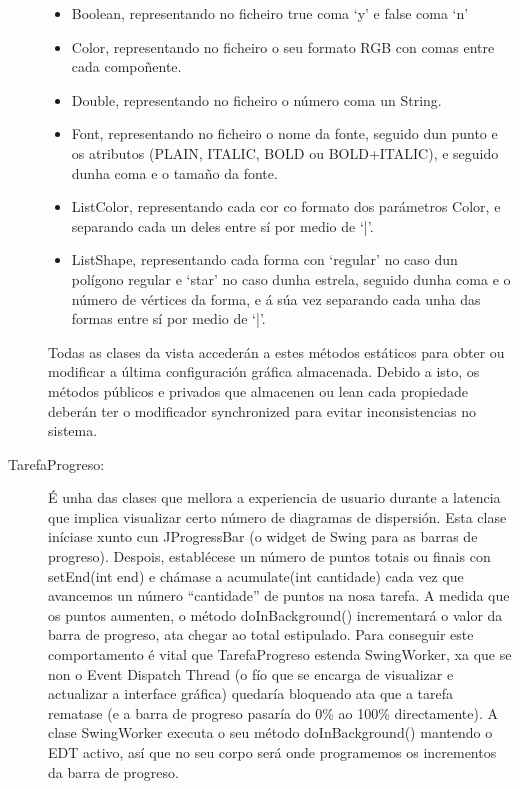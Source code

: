 \begin{description}
\begin{itemize}
\item Boolean, representando no ficheiro true coma `y' e false coma `n'
\item Color, representando no ficheiro o seu formato RGB con comas entre cada compoñente.
\item Double, representando no ficheiro o número coma un String.
\item Font, representando no ficheiro o nome da fonte, seguido dun punto e os atributos (PLAIN, ITALIC, BOLD ou BOLD+ITALIC), e seguido dunha coma e o tamaño da fonte.
\item ListColor, representando cada cor co formato dos parámetros Color, e separando cada un deles entre sí por medio de `|'.
\item ListShape, representando cada forma con `regular' no caso dun polígono regular e `star' no caso dunha estrela, seguido dunha coma e o número de vértices da forma, e á súa vez separando cada unha das formas entre sí por medio de `|'.
\end{itemize}

Todas as clases da vista accederán a estes métodos estáticos para obter ou modificar a última configuración gráfica almacenada. Debido a isto, os métodos públicos e privados que almacenen ou lean cada propiedade deberán ter o modificador synchronized para evitar inconsistencias no sistema.

\item[TarefaProgreso:] \hfill
É unha das clases que mellora a experiencia de usuario durante a latencia que implica visualizar certo número de diagramas de dispersión. Esta clase iníciase xunto cun JProgressBar (o widget de Swing para as barras de progreso). Despois, establécese un número de puntos totais ou finais con setEnd(int end) e chámase a acumulate(int cantidade) cada vez que avancemos un número ``cantidade'' de puntos na nosa tarefa. A medida que os puntos aumenten, o método doInBackground() incrementará o valor da barra de progreso, ata chegar ao total estipulado.
Para conseguir este comportamento é vital que TarefaProgreso estenda SwingWorker, xa que se non o Event Dispatch Thread (o fío que se encarga de visualizar e actualizar a interface gráfica) quedaría bloqueado ata que a tarefa rematase (e a barra de progreso pasaría do 0\% ao 100\% directamente). A clase SwingWorker executa o seu método doInBackground() mantendo o EDT activo, así que no seu corpo será onde programemos os incrementos da barra de progreso.


\end{description}
